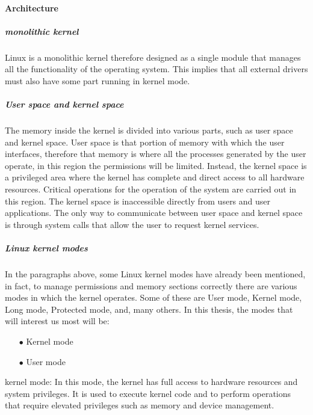     \paragraph{Architecture}
    \subparagraph{monolithic kernel}
    Linux is a monolithic kernel therefore designed as a single module that manages all the functionality of the operating system.\newline
    This implies that all external drivers must also have some part running in kernel mode.\newline
    \subparagraph{User space and kernel space}
    The memory inside the kernel is divided into various parts, such as user space and kernel space.\newline
    User space is that portion of memory with which the user interfaces, therefore that memory is where all the processes generated by the user operate, in this region the permissions will be limited.\newline
    Instead, the kernel space is a privileged area where the kernel has complete and direct access to all hardware resources.\newline
    Critical operations for the operation of the system are carried out in this region.\newline
    The kernel space is inaccessible directly from users and user applications.\newline
    The only way to communicate between user space and kernel space is through system calls that allow the user to request kernel services.\newline
    \subparagraph{Linux kernel modes}
    In the paragraphs above, some Linux kernel modes have already been mentioned, in fact, to manage permissions and memory sections correctly there are various modes in which the kernel operates.\newline
    Some of these are User mode, Kernel mode, Long mode, Protected mode, and, many others.\newline
    In this thesis, the modes that will interest us most will be:\newline
    \begin{itemize}
        \item[$\bullet$] Kernel mode
        \item[$\bullet$] User mode
    \end{itemize}
    kernel mode: In this mode, the kernel has full access to hardware resources and system privileges.\newline
    It is used to execute kernel code and to perform operations that require elevated privileges such as memory and device management.\newline
